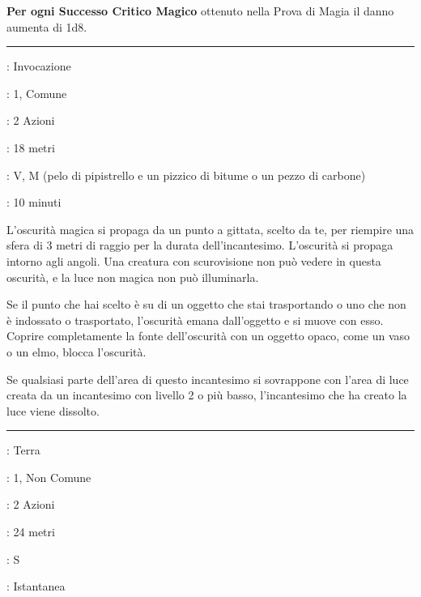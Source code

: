 \begin{multicols}{2}
\textbf{Per ogni Successo Critico Magico} ottenuto nella Prova di Magia il danno aumenta di 1d8.

\smallskip\noindent\rule{\linewidth}{2pt} \hypertarget{Oscurità}{}\medskip{}
\noindent
\begin{description}[noitemsep, topsep=0pt, parsep=0pt, partopsep=0pt, leftmargin=0cm, labelwidth=2.8cm]
	\item[\textbf{Lista di Magia}]: Invocazione
	\item[\textbf{Livello}]: 1, Comune
	\item[\textbf{T. di Lancio}]: 2 Azioni
	\item[\textbf{Gittata}]: 18 metri
	\item[\textbf{Componenti}]: V, M (pelo di pipistrello e un pizzico di bitume o un pezzo di carbone)
	\item[\textbf{Durata}]: 10 minuti
\end{description}

L'oscurità magica si propaga da un punto a gittata, scelto da te, per riempire una sfera di 3 metri di raggio per la durata dell'incantesimo. L'oscurità si propaga intorno agli angoli. Una creatura con scurovisione non può vedere in questa oscurità, e la luce non magica non può illuminarla.

Se il punto che hai scelto è su di un oggetto che stai trasportando o uno che non è indossato o trasportato, l'oscurità emana dall'oggetto e si muove con esso. Coprire completamente la fonte dell'oscurità con un oggetto opaco, come un vaso o un elmo, blocca l'oscurità.

Se qualsiasi parte dell'area di questo incantesimo si sovrappone con l'area di luce creata da un incantesimo con livello 2 o più basso, l'incantesimo che ha creato la luce viene dissolto.

\smallskip\noindent\rule{\linewidth}{2pt} \hypertarget{Palla di fango di Eithne}{}\medskip{}
\noindent
\begin{description}[noitemsep, topsep=0pt, parsep=0pt, partopsep=0pt, leftmargin=0cm, labelwidth=2.8cm]
	\item[\textbf{Lista di Magia}]: Terra
	\item[\textbf{Livello}]: 1, Non Comune
	\item[\textbf{T. di Lancio}]: 2 Azioni
	\item[\textbf{Gittata}]: 24 metri
	\item[\textbf{Componenti}]: S
	\item[\textbf{Durata}]: Istantanea
\end{description}


\end{multicols}
